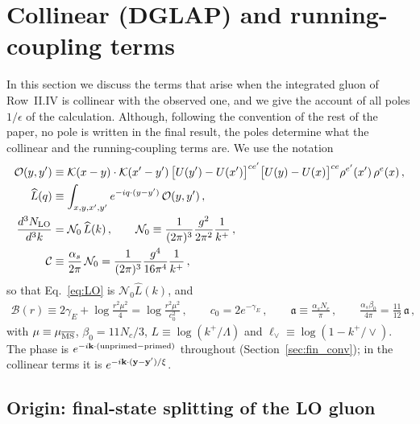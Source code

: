 \section{Collinear (DGLAP) and running-coupling terms}\label{sec:dglap_rc}

In this section we discuss the terms that arise when the integrated gluon of Row~II.IV is collinear with the observed one, and we give the account of all poles $1/\epsilon$ of the calculation. Although, following the convention of the rest of the paper, no pole is written in the final result, the poles determine what the collinear and the running-coupling terms are. We use the notation
\begin{align}\label{eq:dg_not}
\mathcal O(y,y')&\equiv\mathcal{K}(x-y)\cdot\mathcal{K}(x'-y')\,\big[U(y')-U(x')\big]^{ce'}\big[U(y)-U(x)\big]^{ce}\rho^{e'}(x')\,\rho^{e}(x)\,,\notag\\
\widehat L(q)&\equiv\int_{x,y,x',y'}e^{-iq\cdot(y-y')}\,\mathcal O(y,y')\,,\notag\\
\frac{d^3N_{\rm LO}}{d^3k}&=\mathcal N_0\,\widehat L(k)\,,\qquad
\mathcal N_0\equiv\frac{1}{(2\pi)^3}\frac{g^2}{2\pi^2}\frac{1}{k^+}\,,\notag\\
\mathcal C&\equiv\frac{\alpha_s}{2\pi}\,\mathcal N_0=\frac{1}{(2\pi)^3}\frac{g^4}{16\pi^4}\frac{1}{k^+}\,,
\end{align}
so that Eq.~\eqref{eq:LO} is $\mathcal N_0\widehat L(k)$, and
\begin{align}\label{eq:dg_B}
\mathcal B(r)\equiv2\gamma_E+\log\frac{r^2\mu^2}{4}=\log\frac{r^2\mu^2}{c_0^2}\,,\qquad c_0=2e^{-\gamma_E}\,,\qquad
\mathfrak a\equiv\frac{\alpha_sN_c}{\pi}\,,\qquad \frac{\alpha_s\beta_0}{4\pi}=\frac{11}{12}\,\mathfrak a\,,
\end{align}
with $\mu\equiv\mu_{\overline{\rm MS}}$, $\beta_0=11N_c/3$, $L\equiv\log(k^+/\Lambda)$ and $\ell_\vee\equiv\log(1-k^+/\vee)$. The phase is $e^{-i\mathbf{k}\cdot(\text{unprimed}-\text{primed})}$ throughout (Section~\ref{sec:fin_conv}); in the collinear terms it is $e^{-i\mathbf{k}\cdot(\mathbf{y}-\mathbf{y}')/\xi}$.

\subsection{Origin: final-state splitting of the LO gluon}\label{sec:dg_origin}

